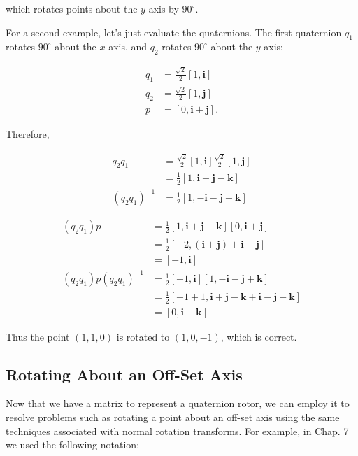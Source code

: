 \documentclass[10pt]{article}
\begin{document}
which rotates points about the $y$-axis by $90^{\circ}$.

For a second example, let's just evaluate the quaternions. The first quaternion $q_{1}$ rotates $90^{\circ}$ about the $x$-axis, and $q_{2}$ rotates $90^{\circ}$ about the $y$-axis:

$$
\begin{aligned}
q_{1} & =\frac{\sqrt{2}}{2}[1, \mathbf{i}] \\
q_{2} & =\frac{\sqrt{2}}{2}[1, \mathbf{j}] \\
p & =[0, \mathbf{i}+\mathbf{j}] .
\end{aligned}
$$

Therefore,

$$
\begin{aligned}
q_{2} q_{1} & =\frac{\sqrt{2}}{2}[1, \mathbf{i}] \frac{\sqrt{2}}{2}[1, \mathbf{j}] \\
& =\frac{1}{2}[1, \mathbf{i}+\mathbf{j}-\mathbf{k}] \\
\left(q_{2} q_{1}\right)^{-1} & =\frac{1}{2}[1,-\mathbf{i}-\mathbf{j}+\mathbf{k}]
\end{aligned}
$$

$$
\begin{aligned}
\left(q_{2} q_{1}\right) p & =\frac{1}{2}[1, \mathbf{i}+\mathbf{j}-\mathbf{k}][0, \mathbf{i}+\mathbf{j}] \\
& =\frac{1}{2}[-2,(\mathbf{i}+\mathbf{j})+\mathbf{i}-\mathbf{j}] \\
& =[-1, \mathbf{i}] \\
\left(q_{2} q_{1}\right) p\left(q_{2} q_{1}\right)^{-1} & =\frac{1}{2}[-1, \mathbf{i}][1,-\mathbf{i}-\mathbf{j}+\mathbf{k}] \\
& =\frac{1}{2}[-1+1, \mathbf{i}+\mathbf{j}-\mathbf{k}+\mathbf{i}-\mathbf{j}-\mathbf{k}] \\
& =[0, \mathbf{i}-\mathbf{k}]
\end{aligned}
$$

Thus the point $(1,1,0)$ is rotated to $(1,0,-1)$, which is correct.

\subsection{Rotating About an Off-Set Axis}
Now that we have a matrix to represent a quaternion rotor, we can employ it to resolve problems such as rotating a point about an off-set axis using the same techniques associated with normal rotation transforms. For example, in Chap. 7 we used the following notation:
\end{document}
